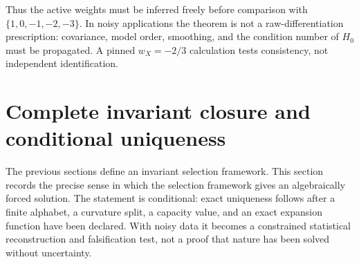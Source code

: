 \documentclass[aps,prd,reprint,nofootinbib,superscriptaddress,floatfix]{revtex4-2}
\numberwithin{equation}{section}
\theoremstyle{definition}
\theoremstyle{plain}
\begin{document}
Thus the active weights must be inferred freely before comparison with \(\{1,0,-1,-2,-3\}\).  In noisy applications the theorem is not a raw-differentiation prescription: covariance, model order, smoothing, and the condition number of \(H_0\) must be propagated.  A pinned \(w_X=-2/3\) calculation tests consistency, not independent identification.



\section{Complete invariant closure and conditional uniqueness}\label{sec:complete-closure}

The previous sections define an invariant selection framework.  This section records the
precise sense in which the selection framework gives an algebraically forced solution.
The statement is conditional: exact uniqueness follows after a finite
alphabet, a curvature split, a capacity value, and an exact expansion
function have been declared.  With noisy data it becomes a constrained
statistical reconstruction and falsification test, not a proof that nature
has been solved without uncertainty.
\end{document}
